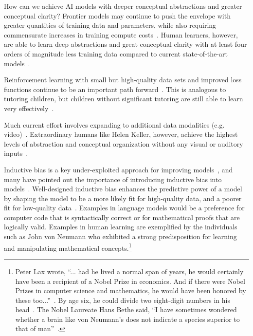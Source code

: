 \documentclass{article}
\begin{document}
How can we achieve AI models with deeper conceptual abstractions and greater conceptual clarity?  Frontier models may continue to push the envelope with greater quantities of training data and parameters, while also requiring commensurate increases in training compute costs~\citep{amodei2018ai}. Human learners, however, are able to learn deep abstractions and great conceptual clarity with at least four orders of magnitude less training data compared to current state-of-the-art models~\citep{frank2023bridging}.

Reinforcement learning with small but high-quality data sets and improved loss functions continue to be an important path forward~\citep{knight2023openai, thomaz2006reinforcement}. This is analogous to tutoring children, but children without significant tutoring are still able to learn very effectively~\citep{gopnik1999scientist}.

Much current effort involves expanding to additional data modalities (e.g. video)~\citep{DBLP:journals/corr/abs-1904-01766}.  Extraordinary humans like Helen Keller, however, achieve the highest levels of abstraction and conceptual organization without any visual or auditory inputs~\citep{herrmann1999helen}.

Inductive bias is a key under-exploited approach for improving models~\citep{goyal2022inductive}, and many have pointed out the importance of introducing inductive bias into models~\citep{mittal2022modular, DBLP:journals/corr/abs-2011-15091, DBLP:journals/corr/abs-2103-00336, gruber2013nature}. Well-designed inductive bias enhances the predictive power of a model by shaping the model to be a more likely fit for high-quality data, and a poorer fit for low-quality data~\citep{mackay2003information}. Examples in language models would be a preference for computer code that is syntactically correct or for mathematical proofs that are logically valid. Examples in human learning are exemplified by the individuals such as John von Neumann who exhibited a strong predisposition for learning and manipulating mathematical concepts.\footnote{Peter Lax wrote, ``... had he lived a normal span of years, he would certainly have been a recipient of a Nobel Prize in economics. And if there were Nobel Prizes in computer science and mathematics, he would have been honored by these too...''~\citep{Redei2005}. By age six, he could divide two eight-digit numbers in his head~\citep{Schneider2015, Henderson2007}. The Nobel Laureate Hans Bethe said, ``I have sometimes wondered whether a brain like von Neumann's does not indicate a species superior to that of man''~\citep{Macrae1992, Blair1957}.}
\end{document}
